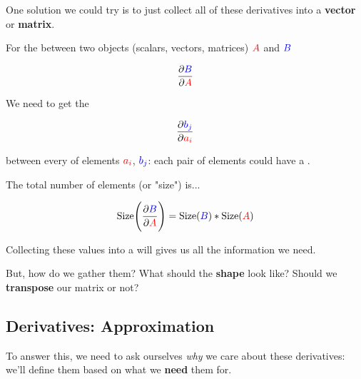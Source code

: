         One solution we could try is to just collect all of these derivatives into a \textbf{vector} or \textbf{matrix}.\\
        
        \begin{concept}
            For the  between two objects (scalars, vectors, matrices) $\textcolor{red}{A}$ and $\textcolor{blue}{B}$
            
            \begin{equation*}
                \frac{\partial \textcolor{blue}{B}}{\partial \textcolor{red}{A}}
            \end{equation*}
            
            We need to get the 
            
            \begin{equation*}
                \frac{\partial \textcolor{blue}{b_j}}{\partial \textcolor{red}{a_i}}
            \end{equation*}
            
            between every  of elements $\textcolor{red}{a_i}$, $\textcolor{blue}{b_j}$: each pair of elements could have a .
            
            The total number of elements (or "size") is...
            
            \begin{equation*}
                \text{Size}\Bigg(  \frac{\partial \textcolor{blue}{B}}{\partial \textcolor{red}{A}}  \Bigg) 
                = 
                \text{Size}(\textcolor{blue}{B})
                *
                \text{Size}(\textcolor{red}{A})
            \end{equation*}
            
            Collecting these values into a  will gives us all the information we need.
        \end{concept}
        
        But, how do we gather them? What should the \textbf{shape} look like? Should we \textbf{transpose} our matrix or not?
    
    \secdiv
    
    \subsection{Derivatives: Approximation}
        
        To answer this, we need to ask ourselves \textit{why} we care about these derivatives: we'll define them based on what we \textbf{need} them for.
        
